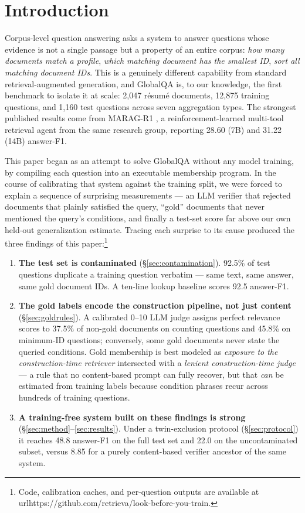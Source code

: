 \documentclass[11pt]{article}
\begin{document}
\section{Introduction}

Corpus-level question answering asks a system to answer questions whose evidence is not a single passage but a property of an entire corpus: \emph{how many documents match a profile}, \emph{which matching document has the smallest ID}, \emph{sort all matching document IDs}. This is a genuinely different capability from standard retrieval-augmented generation, and GlobalQA \cite{globalqa} is, to our knowledge, the first benchmark to isolate it at scale: 2{,}047 r\'esum\'e documents, 12{,}875 training questions, and 1{,}160 test questions across seven aggregation types. The strongest published results come from MARAG-R1 \cite{marag}, a reinforcement-learned multi-tool retrieval agent from the same research group, reporting 28.60 (7B) and 31.22 (14B) answer-F1.

This paper began as an attempt to solve GlobalQA without any model training, by compiling each question into an executable membership program. In the course of calibrating that system against the training split, we were forced to explain a sequence of surprising measurements --- an LLM verifier that rejected documents that plainly satisfied the query, ``gold'' documents that never mentioned the query's conditions, and finally a test-set score far above our own held-out generalization estimate. Tracing each surprise to its cause produced the three findings of this paper:\footnote{Code, calibration caches, and per-question outputs are available at \\url{https://github.com/retrieva/look-before-you-train}.}

\begin{enumerate}
\item \textbf{The test set is contaminated} (\S\ref{sec:contamination}). 92.5\% of test questions duplicate a training question verbatim --- same text, same answer, same gold document IDs. A ten-line lookup baseline scores 92.5 answer-F1.
\item \textbf{The gold labels encode the construction pipeline, not just content} (\S\ref{sec:goldrules}). A calibrated 0--10 LLM judge assigns perfect relevance scores to 37.5\% of non-gold documents on counting questions and 45.8\% on minimum-ID questions; conversely, some gold documents never state the queried conditions. Gold membership is best modeled as \emph{exposure to the construction-time retriever} intersected with a \emph{lenient construction-time judge} --- a rule that no content-based prompt can fully recover, but that \emph{can} be estimated from training labels because condition phrases recur across hundreds of training questions.
\item \textbf{A training-free system built on these findings is strong} (\S\ref{sec:method}--\ref{sec:results}). Under a twin-exclusion protocol (\S\ref{sec:protocol}) it reaches 48.8 answer-F1 on the full test set and 22.0 on the uncontaminated subset, versus 8.85 for a purely content-based verifier ancestor of the same system.
\end{enumerate}
\end{document}
